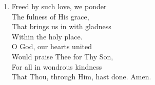 \begin{enumerate}
    \item Freed by such love, we ponder \\
        The fulness of His grace, \\
        That brings us in with gladness \\
        Within the holy place. \\
        O God, our hearts united \\
        Would praise Thee for Thy Son, \\
        For all in wondrous kindness \\
        That Thou, through Him, hast done. Amen.

\end{enumerate}
